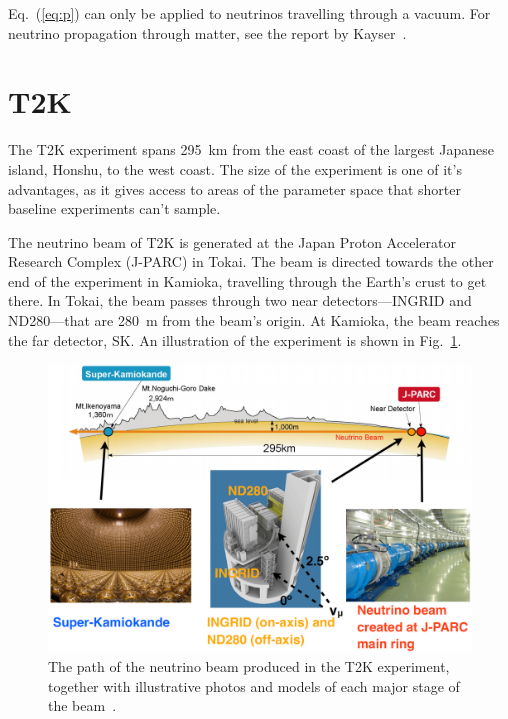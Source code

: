 \documentclass[aps,pra,12pt,notitlepage,tightenlines]{revtex4-1}
\begin{document}
Eq.~(\ref{eq:p}) can only be applied to neutrinos travelling through a vacuum. For neutrino propagation through matter, see the report by Kayser~\cite{Kayser:2005cd}.

\section{T2K}
The T2K experiment spans 295~km from the east coast of the largest Japanese island, Honshu, to the west coast. The size of the experiment is one of it's advantages, as it gives access to areas of the parameter space that shorter baseline experiments can't sample. 

The neutrino beam of T2K is generated at the Japan Proton Accelerator Research Complex (J-PARC) in Tokai. The beam is directed towards the other end of the experiment in Kamioka, travelling through the Earth's crust to get there. In Tokai, the beam passes through two near detectors---INGRID and ND280---that are 280~m from the beam's origin. At Kamioka, the beam reaches the far detector, SK. An illustration of the experiment is shown in Fig.\ \ref{fig:t2k}.
\begin{figure}
 \includegraphics[scale=0.33]{T2K_detail}
 \caption{The path of the neutrino beam produced in the T2K experiment, together with illustrative photos and models of each major stage of the beam~\cite{Jamieson:2015rza}.}
 \label{fig:t2k}
\end{figure}
\end{document}
